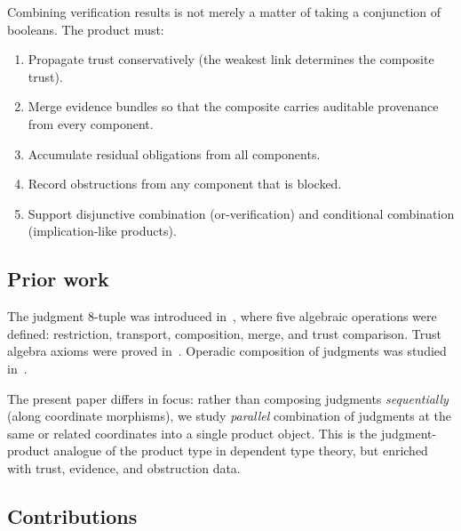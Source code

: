 \documentclass[11pt]{article}
\begin{document}
Combining verification results is not merely a matter of taking a
conjunction of booleans.  The product must:
\begin{enumerate}[label=(\roman*)]
  \item Propagate trust conservatively (the weakest link determines the
        composite trust).
  \item Merge evidence bundles so that the composite carries auditable
        provenance from every component.
  \item Accumulate residual obligations from all components.
  \item Record obstructions from any component that is blocked.
  \item Support disjunctive combination (or-verification) and conditional
        combination (implication-like products).
\end{enumerate}

\subsection{Prior work}

The judgment 8-tuple was introduced in~\cite{jugeo02}, where five
algebraic operations were defined: restriction, transport, composition,
merge, and trust comparison.  Trust algebra axioms were proved
in~\cite{jugeo04}.  Operadic composition of judgments was studied
in~\cite{jugeo14}.

The present paper differs in focus: rather than composing judgments
\emph{sequentially} (along coordinate morphisms), we study
\emph{parallel} combination of judgments at the same or related
coordinates into a single product object.  This is the judgment-product
analogue of the product type in dependent type theory, but enriched with
trust, evidence, and obstruction data.

\subsection{Contributions}
\end{document}
